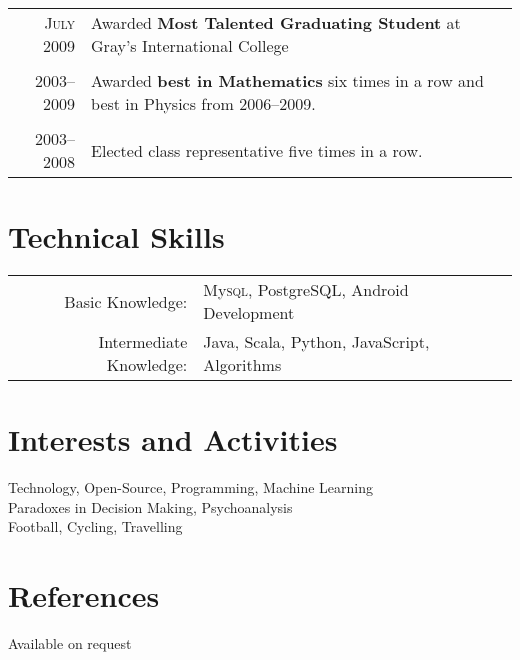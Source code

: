 \documentclass[a4paper,10pt]{article}
\begin{document}
\begin{tabular}{rl}
  \textsc{July} 2009 & Awarded \textbf{Most Talented Graduating Student} at Gray’s International
  College\\\\

  \textsc{2003--2009} & Awarded \textbf{best in Mathematics} six times in a row and best in Physics
  from 2006--2009.\\\\

  \textsc{2003--2008} & Elected class representative five times in a row.
\end{tabular}

\section{Technical Skills}
\begin{tabular}{rl}
  Basic Knowledge:& My\textsc{sql}, PostgreSQL, Android Development\\
  Intermediate Knowledge:& Java, Scala, Python, JavaScript, Algorithms
\end{tabular}

\section{Interests and Activities}
Technology, Open-Source, Programming, Machine Learning\\
Paradoxes in Decision Making, Psychoanalysis\\
Football, Cycling, Travelling

\section{References}
Available on request
\end{document}
